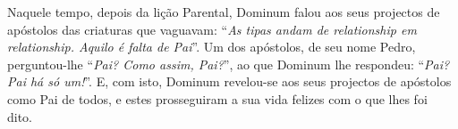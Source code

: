 \documentclass[11pt, twoside]{Thesis} %
\newcommand*{\defaultlinespacing}{\setstretch{1.5}}
\begin{document}
\frontmatter %

\defaultlinespacing %



% 
% 

\maketitle



{
	Naquele tempo, depois da lição Parental, Dominum falou aos seus projectos de apóstolos das criaturas que vaguavam: ``\emph{As tipas andam de relationship em relationship. Aquilo é falta de Pai}''. Um dos apóstolos, de seu nome Pedro, perguntou-lhe ``\emph{Pai? Como assim, Pai?}'', ao que Dominum lhe respondeu: ``\emph{Pai? Pai há só um!}''. E, com isto, Dominum revelou-se aos seus projectos de apóstolos como Pai de todos, e estes prosseguiram a sua vida felizes com o que lhes foi dito.~\cite{Rosa2017}
}






\end{document}
